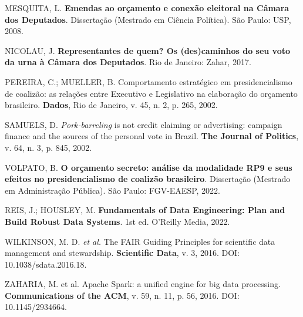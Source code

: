 \documentclass[12pt,a4paper,oneside]{article}
\begin{document}
\begin{singlespace}
\noindent\hangindent=1.25cm
MESQUITA, L. \textbf{Emendas ao orçamento e conexão eleitoral na
Câmara dos Deputados}. Dissertação (Mestrado em Ciência Política).
São Paulo: USP, 2008.\par\smallskip

\noindent\hangindent=1.25cm
NICOLAU, J. \textbf{Representantes de quem? Os (des)caminhos do seu
voto da urna à Câmara dos Deputados}. Rio de Janeiro: Zahar, 2017.
\par\smallskip

\noindent\hangindent=1.25cm
PEREIRA, C.; MUELLER, B. Comportamento estratégico em
presidencialismo de coalizão: as relações entre Executivo e
Legislativo na elaboração do orçamento brasileiro. \textbf{Dados},
Rio de Janeiro, v. 45, n. 2, p. 265, 2002.\par\smallskip

\noindent\hangindent=1.25cm
SAMUELS, D. \textit{Pork-barreling} is not credit claiming or
advertising: campaign finance and the sources of the personal vote in
Brazil. \textbf{The Journal of Politics}, v. 64, n. 3,
p. 845, 2002.\par\smallskip

\noindent\hangindent=1.25cm
VOLPATO, B. \textbf{O orçamento secreto: análise da modalidade RP9 e
seus efeitos no presidencialismo de coalizão brasileiro}. Dissertação
(Mestrado em Administração Pública). São Paulo: FGV-EAESP, 2022.
\par\smallskip

\noindent\hangindent=1.25cm
REIS, J.; HOUSLEY, M. \textbf{Fundamentals of Data Engineering: Plan
and Build Robust Data Systems}. 1st ed. O'Reilly Media, 2022.
\par\smallskip

\noindent\hangindent=1.25cm
WILKINSON, M. D. \textit{et al.} The FAIR Guiding Principles for
scientific data management and stewardship. \textbf{Scientific Data},
v. 3, 2016. DOI: 10.1038/sdata.2016.18.\par\smallskip

\noindent\hangindent=1.25cm
ZAHARIA, M. et al. Apache Spark: a unified engine for big data
processing. \textbf{Communications of the ACM}, v. 59, n. 11,
p. 56, 2016. DOI: 10.1145/2934664.
\end{singlespace}
\end{document}
